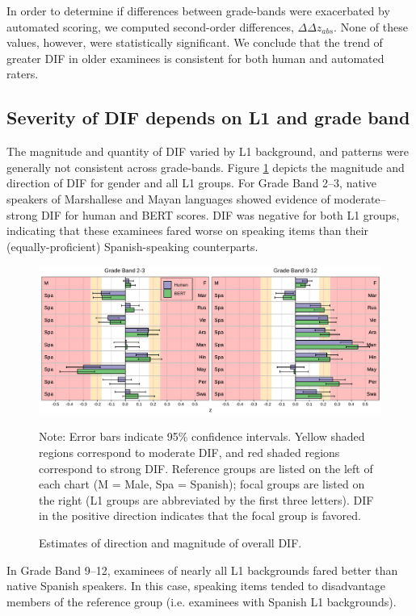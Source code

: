 \documentclass [PhD] {uclathes}
\begin{document}
In order to determine if differences between grade-bands were exacerbated by automated scoring, we computed second-order differences, $\Delta \Delta z_{abs}$. None of these values, however, were statistically significant. We conclude that the trend of greater DIF in older examinees is consistent for both human and automated raters. 

\subsection{Severity of DIF depends on L1 and grade band}

The magnitude and quantity of DIF varied by L1 background, and patterns were generally not consistent across grade-bands. Figure \ref{fig:z_ovr} depicts the magnitude and direction of DIF for gender and all L1 groups. For Grade Band 2–3, native speakers of Marshallese and Mayan languages showed evidence of moderate–strong DIF for human and BERT scores. DIF was negative for both L1 groups, indicating that these examinees fared worse on speaking items than their (equally-proficient) Spanish-speaking counterparts. 

\begin{figure}[t]
    \centering
    \caption{Estimates of direction and magnitude of overall DIF.}
\includegraphics[width=6.5in]{figures/20230504_ETS-DIF_BERT_z_ovr_edit.pdf}   
    \label{fig:z_ovr}
{\newline Note: Error bars indicate 95\% confidence intervals. Yellow shaded regions correspond to moderate DIF, and red shaded regions correspond to strong DIF. Reference groups are listed on the left of each chart (M = Male, Spa = Spanish); focal groups are listed on the right (L1 groups are abbreviated by the first three letters). DIF in the positive direction indicates that the focal group is favored. \par}
\end{figure}

In Grade Band 9–12, examinees of nearly all L1 backgrounds fared better than native Spanish speakers. In this case, speaking items tended to disadvantage members of the reference group (i.e. examinees with Spanish L1 backgrounds). 
\end{document}
